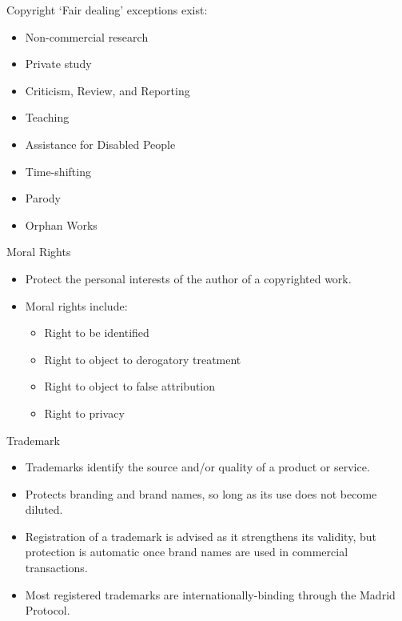 \begin{frame}{Copyright}
`Fair dealing' exceptions exist:

	\begin{itemize}
		\item Non-commercial research
		\item Private study
		\item Criticism, Review, and Reporting
		\item Teaching
		\item Assistance for Disabled People
		\item Time-shifting
		\item Parody
		\item Orphan Works
	\end{itemize}
\end{frame}

\begin{frame}{Moral Rights}
	\begin{itemize}
		\item Protect the personal interests of the author of a copyrighted work.
		\item Moral rights include:
		\begin{itemize}
			\item Right to be identified
			\item Right to object to derogatory treatment
			\item Right to object to false attribution
			\item Right to privacy
		\end{itemize}
	\end{itemize}
\end{frame}

\begin{frame}{Trademark}
	\begin{itemize}
		\item Trademarks identify the source and/or quality of a product or service.
		\item Protects branding and brand names, so long as its use does not become diluted.
		\item Registration of a trademark is advised as it strengthens its validity, but 
		protection is automatic once brand names are used in commercial transactions.
		\item Most registered trademarks are internationally-binding through the Madrid Protocol.
	\end{itemize}
\end{frame}

